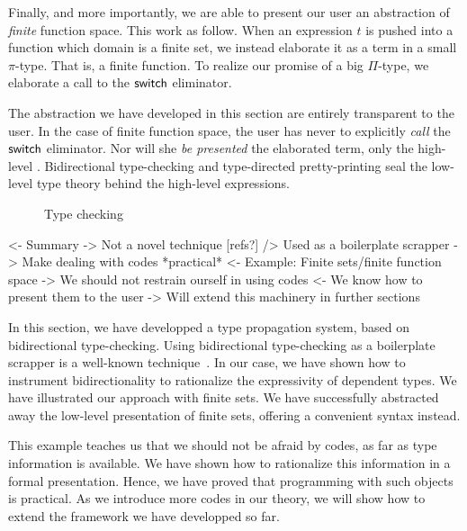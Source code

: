 
Finally, and more importantly, we are able to present our user an
abstraction of \emph{finite} function space. This work as follow. When
an expression $t$ is pushed into a function which domain is a finite
set, we instead elaborate it as a term in a small $\pi$-type. That is,
a finite function. To realize our promise of a big $\Pi$-type, we
elaborate a call to the $\F{switch}$ eliminator. 

The abstraction we have developed in this section are entirely
transparent to the user. In the case of finite function space, the
user has never to explicitly \emph{call} the $\F{switch}$
eliminator. Nor will she \emph{be presented} the elaborated term, only
the high-level . Bidirectional type-checking and type-directed
pretty-printing seal the low-level type theory behind the high-level
expressions.

\begin{figure}

\caption{Type checking}
\label{fig:type-checking}
\end{figure}

\begin{wstructure}
<- Summary
    -> Not a novel technique [refs?]
        /> Used as a boilerplate scrapper
    -> Make dealing with codes *practical*
        <- Example: Finite sets/finite function space
        -> We should not restrain ourself in using codes
            <- We know how to present them to the user
-> Will extend this machinery in further sections
\end{wstructure}

In this section, we have developped a type propagation system, based
on bidirectional type-checking. Using bidirectional type-checking as a
boilerplate scrapper is a well-known technique~\cite{}. In our case,
we have shown how to instrument bidirectionality to rationalize the
expressivity of dependent types. We have illustrated our approach with
finite sets. We have successfully abstracted away the low-level
presentation of finite sets, offering a convenient syntax instead.

This example teaches us that we should not be afraid by codes, as far
as type information is available. We have shown how to rationalize
this information in a formal presentation. Hence, we have proved that
programming with such objects is practical. As we introduce more codes
in our theory, we will show how to extend the framework we have
developped so far.
